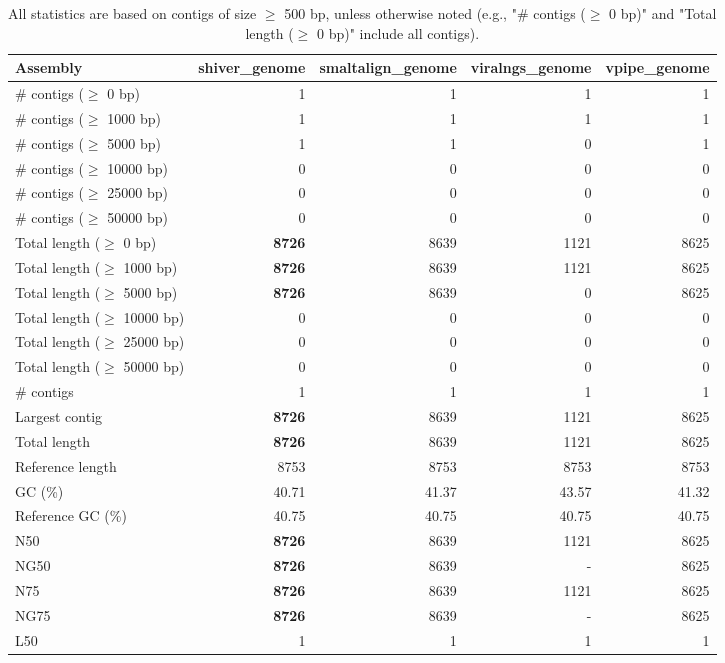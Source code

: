 \documentclass[12pt,a4paper]{article}
\begin{document}
\begin{table}[ht]
\begin{center}
\caption{All statistics are based on contigs of size $\geq$ 500 bp, unless otherwise noted (e.g., "\# contigs ($\geq$ 0 bp)" and "Total length ($\geq$ 0 bp)" include all contigs).}
\begin{tabular}{|l*{4}{|r}|}
\hline
Assembly & shiver\_genome & smaltalign\_genome & viralngs\_genome & vpipe\_genome \\ \hline
\# contigs ($\geq$ 0 bp) & 1 & 1 & 1 & 1 \\ \hline
\# contigs ($\geq$ 1000 bp) & 1 & 1 & 1 & 1 \\ \hline
\# contigs ($\geq$ 5000 bp) & 1 & 1 & 0 & 1 \\ \hline
\# contigs ($\geq$ 10000 bp) & 0 & 0 & 0 & 0 \\ \hline
\# contigs ($\geq$ 25000 bp) & 0 & 0 & 0 & 0 \\ \hline
\# contigs ($\geq$ 50000 bp) & 0 & 0 & 0 & 0 \\ \hline
Total length ($\geq$ 0 bp) & {\bf 8726} & 8639 & 1121 & 8625 \\ \hline
Total length ($\geq$ 1000 bp) & {\bf 8726} & 8639 & 1121 & 8625 \\ \hline
Total length ($\geq$ 5000 bp) & {\bf 8726} & 8639 & 0 & 8625 \\ \hline
Total length ($\geq$ 10000 bp) & 0 & 0 & 0 & 0 \\ \hline
Total length ($\geq$ 25000 bp) & 0 & 0 & 0 & 0 \\ \hline
Total length ($\geq$ 50000 bp) & 0 & 0 & 0 & 0 \\ \hline
\# contigs & 1 & 1 & 1 & 1 \\ \hline
Largest contig & {\bf 8726} & 8639 & 1121 & 8625 \\ \hline
Total length & {\bf 8726} & 8639 & 1121 & 8625 \\ \hline
Reference length & 8753 & 8753 & 8753 & 8753 \\ \hline
GC (\%) & 40.71 & 41.37 & 43.57 & 41.32 \\ \hline
Reference GC (\%) & 40.75 & 40.75 & 40.75 & 40.75 \\ \hline
N50 & {\bf 8726} & 8639 & 1121 & 8625 \\ \hline
NG50 & {\bf 8726} & 8639 & - & 8625 \\ \hline
N75 & {\bf 8726} & 8639 & 1121 & 8625 \\ \hline
NG75 & {\bf 8726} & 8639 & - & 8625 \\ \hline
L50 & 1 & 1 & 1 & 1 \\ \hline

\end{tabular}
\end{center}
\end{table}
\end{document}
